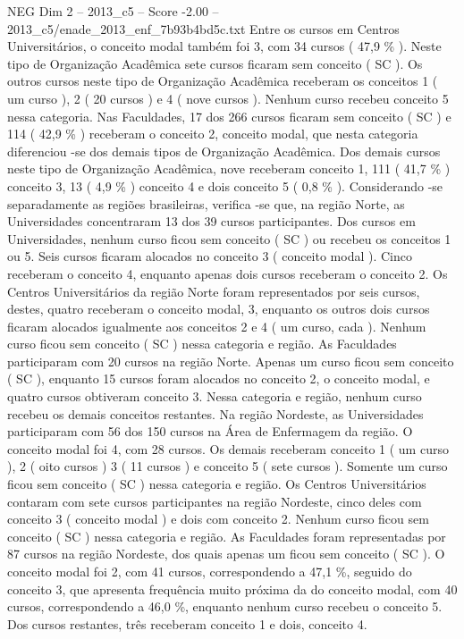 \begin{textsample}{NEG Dim 2 – 2013\_c5 – Score -2.00 – 2013\_c5/enade\_2013\_enf\_7b93b4bd5c.txt}
Entre os cursos em Centros Universitários, o conceito modal também foi 3, com 34 cursos ( 47,9 \% ).
Neste tipo de Organização Acadêmica sete cursos ficaram sem conceito ( SC ).
Os outros cursos neste tipo de Organização Acadêmica receberam os conceitos 1 ( um curso ), 2 ( 20 cursos ) e 4 ( nove cursos ).
Nenhum curso recebeu conceito 5 nessa categoria.
Nas Faculdades, 17 dos 266 cursos ficaram sem conceito ( SC ) e 114 ( 42,9 \% ) receberam o conceito 2, conceito modal, que nesta categoria diferenciou -se dos demais tipos de Organização Acadêmica.
Dos demais cursos neste tipo de Organização Acadêmica, nove receberam conceito 1, 111 ( 41,7 \% ) conceito 3, 13 ( 4,9 \% ) conceito 4 e dois conceito 5 ( 0,8 \% ).
Considerando -se separadamente as regiões brasileiras, verifica -se que, na região Norte, as Universidades concentraram 13 dos 39 cursos participantes.
Dos cursos em Universidades, nenhum curso ficou sem conceito ( SC ) ou recebeu os conceitos 1 ou 5.
Seis cursos ficaram alocados no conceito 3 ( conceito modal ).
Cinco receberam o conceito 4, enquanto apenas dois cursos receberam o conceito 2.
Os Centros Universitários da região Norte foram representados por seis cursos, destes, quatro receberam o conceito modal, 3, enquanto os outros dois cursos ficaram alocados igualmente aos conceitos 2 e 4 ( um curso, cada ).
Nenhum curso ficou sem conceito ( SC ) nessa categoria e região.
As Faculdades participaram com 20 cursos na região Norte.
Apenas um curso ficou sem conceito ( SC ), enquanto 15 cursos foram alocados no conceito 2, o conceito modal, e quatro cursos obtiveram conceito 3.
Nessa categoria e região, nenhum curso recebeu os demais conceitos restantes.
Na região Nordeste, as Universidades participaram com 56 dos 150 cursos na Área de Enfermagem da região.
O conceito modal foi 4, com 28 cursos.
Os demais receberam conceito 1 ( um curso ), 2 ( oito cursos ) 3 ( 11 cursos ) e conceito 5 ( sete cursos ).
Somente um curso ficou sem conceito ( SC ) nessa categoria e região.
Os Centros Universitários contaram com sete cursos participantes na região Nordeste, cinco deles com conceito 3 ( conceito modal ) e dois com conceito 2.
Nenhum curso ficou sem conceito ( SC ) nessa categoria e região.
As Faculdades foram representadas por 87 cursos na região Nordeste, dos quais apenas um ficou sem conceito ( SC ).
O conceito modal foi 2, com 41 cursos, correspondendo a 47,1 \%, seguido do conceito 3, que apresenta frequência muito próxima da do conceito modal, com 40 cursos, correspondendo a 46,0 \%, enquanto nenhum curso recebeu o conceito 5.
Dos cursos restantes, três receberam conceito 1 e dois, conceito 4.

\end{textsample}
